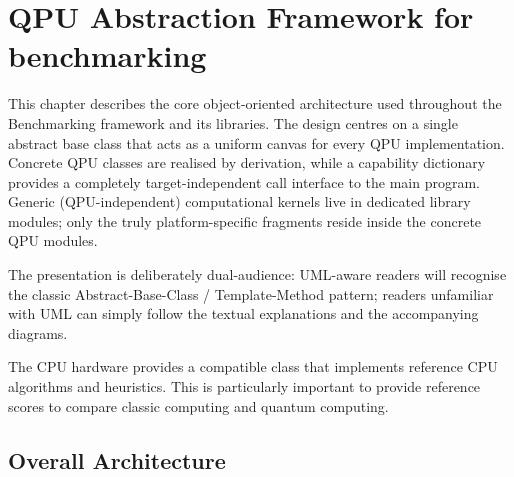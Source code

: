 

\chapter{QPU Abstraction Framework for benchmarking}
\label{chap:QPU-framework-CEA-LIST}

This chapter describes the core object-oriented architecture used throughout the Benchmarking framework and its libraries.  
The design centres on a single abstract base class that acts as a uniform canvas for every QPU implementation.  Concrete QPU classes are realised by derivation, while a capability dictionary provides a completely target-independent call interface to the main program.  Generic (QPU-independent) computational kernels live in dedicated library modules; only the truly platform-specific fragments reside inside the concrete QPU modules.

The presentation is deliberately dual-audience: UML-aware readers will recognise the classic Abstract-Base-Class / Template-Method pattern; readers unfamiliar with UML can simply follow the textual explanations and the accompanying diagrams.

The CPU hardware provides a compatible class that implements reference CPU algorithms and heuristics. This is particularly important to provide reference scores to compare classic computing and quantum computing.

\section{Overall Architecture}

